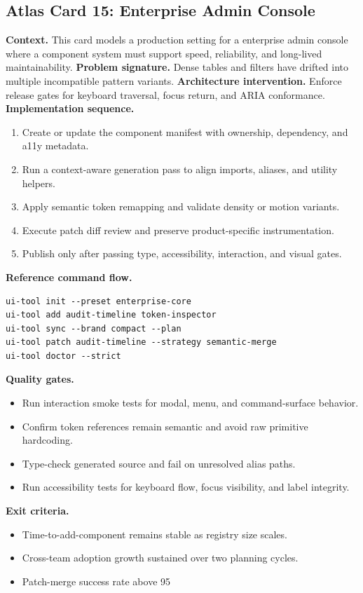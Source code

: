 \subsection*{Atlas Card 15: Enterprise Admin Console}
\textbf{Context.} This card models a production setting for a enterprise admin console where a component system must support speed, reliability, and long-lived maintainability.
\textbf{Problem signature.} Dense tables and filters have drifted into multiple incompatible pattern variants.
\textbf{Architecture intervention.} Enforce release gates for keyboard traversal, focus return, and ARIA conformance.
\textbf{Implementation sequence.}
\begin{enumerate}[leftmargin=*, itemsep=0.28em]
  \item Create or update the component manifest with ownership, dependency, and a11y metadata.
  \item Run a context-aware generation pass to align imports, aliases, and utility helpers.
  \item Apply semantic token remapping and validate density or motion variants.
  \item Execute patch diff review and preserve product-specific instrumentation.
  \item Publish only after passing type, accessibility, interaction, and visual gates.
\end{enumerate}
\textbf{Reference command flow.}
\begin{verbatim}
ui-tool init --preset enterprise-core
ui-tool add audit-timeline token-inspector
ui-tool sync --brand compact --plan
ui-tool patch audit-timeline --strategy semantic-merge
ui-tool doctor --strict
\end{verbatim}
\textbf{Quality gates.}
\begin{itemize}[leftmargin=*, itemsep=0.24em]
  \item Run interaction smoke tests for modal, menu, and command-surface behavior.
  \item Confirm token references remain semantic and avoid raw primitive hardcoding.
  \item Type-check generated source and fail on unresolved alias paths.
  \item Run accessibility tests for keyboard flow, focus visibility, and label integrity.
\end{itemize}
\textbf{Exit criteria.}
\begin{itemize}[leftmargin=*, itemsep=0.24em]
  \item Time-to-add-component remains stable as registry size scales.
  \item Cross-team adoption growth sustained over two planning cycles.
  \item Patch-merge success rate above 95%
\end{itemize}
\clearpage
